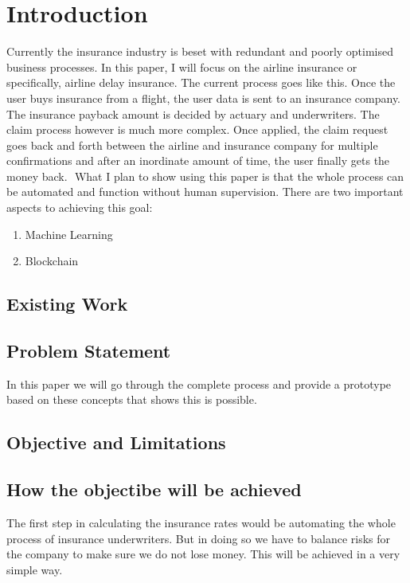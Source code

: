 \chapter{Introduction}

Currently the insurance industry is beset with redundant and poorly optimised business processes. In this paper, I will focus on the airline insurance or specifically, airline delay insurance. The current process goes like this. Once the user buys insurance from a flight, the user data is sent to an insurance company. The insurance payback amount is decided by actuary and underwriters. The claim process however is much more complex. Once applied, the claim request goes back and forth between the airline and insurance company for multiple confirmations and after an inordinate amount of time, the user finally gets the money back.  What I plan to show using this paper is that the whole process can be automated and function without human supervision. There are two important aspects to achieving this goal:
\begin{enumerate}
    \item Machine Learning
    \item Blockchain
\end{enumerate}

\section{Existing Work}

\section{Problem Statement}
In this paper we will go through the complete process and provide a prototype based on these concepts that shows this is possible.

\section{Objective and Limitations}

\section{How the objectibe will be achieved}
The first step in calculating the insurance rates would be automating the whole process of insurance underwriters. But in doing so we have to balance risks for the company to make sure we do not lose money. This will be achieved in a very simple way. 
